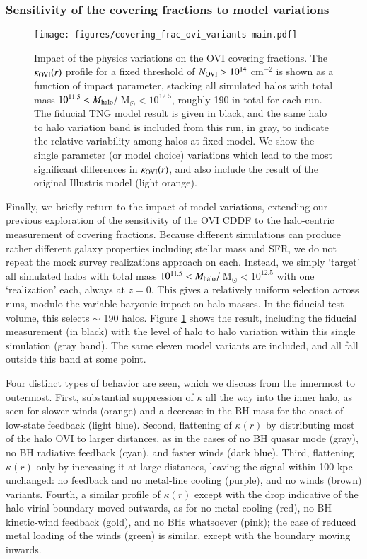\documentclass[useAMS,usenatbib]{mnras}
\newcommand{\msun}{\,M$_{\odot}$\xspace}
\newcommand{\ovi}{OVI\xspace}
\begin{document}
\subsubsection{Sensitivity of the covering fractions to model variations}

\begin{figure}
\centering
\texttt{[image: figures/covering\_frac\_ovi\_variants-main.pdf]}
\caption{ Impact of the physics variations on the \ovi covering fractions. The $\kappa_{\rm OVI}(r)$ profile for a fixed threshold of $N_{\rm OVI} > 10^{14}$ cm$^{-2}$ is shown as a function of impact parameter, stacking all simulated halos with total mass $10^{11.5} < M_{\rm halo}/$\msun$ < 10^{12.5}$, roughly 190 in total for each run. The fiducial TNG model result is given in black, and the same halo to halo variation band is included from this run, in gray, to indicate the relative variability among halos at fixed model. We show the single parameter (or model choice) variations which lead to the most significant differences in $\kappa_{\rm OVI}(r)$, and also include the result of the original Illustris model (light orange).
 \label{fig_cf_variants}}
\end{figure}

Finally, we briefly return to the impact of model variations, extending our previous exploration of the sensitivity of the \ovi CDDF to the halo-centric measurement of covering fractions. Because different simulations can produce rather different galaxy properties including stellar mass and SFR, we do not repeat the mock survey realizations approach on each. Instead, we simply `target' all simulated halos with total mass $10^{11.5} < M_{\rm halo}/$\msun$ < 10^{12.5}$ with one `realization' each, always at $z=0$. This gives a relatively uniform selection across runs, modulo the variable baryonic impact on halo masses. In the fiducial test volume, this selects $\sim$ 190 halos. Figure \ref{fig_cf_variants} shows the result, including the fiducial measurement (in black) with the level of halo to halo variation within this single simulation (gray band). The same eleven model variants are included, and all fall outside this band at some point. 

Four distinct types of behavior are seen, which we discuss from the innermost to outermost. First, substantial suppression of $\kappa$ all the way into the inner halo, as seen for slower winds (orange) and a decrease in the BH mass for the onset of low-state feedback (light blue). Second, flattening of $\kappa(r)$ by distributing most of the halo \ovi to larger distances, as in the cases of no BH quasar mode (gray), no BH radiative feedback (cyan), and faster winds (dark blue). Third, flattening $\kappa(r)$ only by increasing it at large distances, leaving the signal within 100 kpc unchanged: no feedback and no metal-line cooling (purple), and no winds (brown) variants. Fourth, a similar profile of $\kappa(r)$ except with the drop indicative of the halo virial boundary moved outwards, as for no metal cooling (red), no BH kinetic-wind feedback (gold), and no BHs whatsoever (pink); the case of reduced metal loading of the winds (green) is similar, except with the boundary moving inwards.
\end{document}
